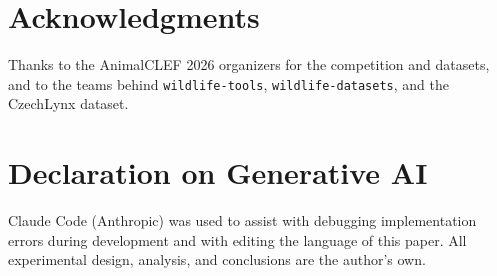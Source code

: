 \documentclass[]{ceurart}
\begin{document}
\section*{Acknowledgments}

Thanks to the AnimalCLEF 2026 organizers for the competition and datasets, and
to the teams behind \texttt{wildlife-tools}, \texttt{wildlife-datasets}, and
the CzechLynx dataset.

\section*{Declaration on Generative AI}

Claude Code (Anthropic) was used to assist with debugging implementation errors
during development and with editing the language of this paper. All experimental
design, analysis, and conclusions are the author's own.


\end{document}
